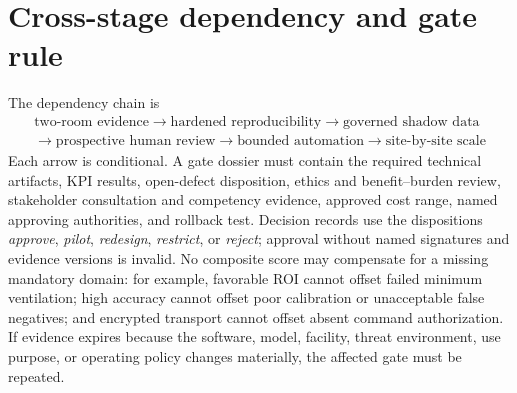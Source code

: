 \section{Cross-stage dependency and gate rule}
The dependency chain is
\begin{equation}
\begin{gathered}
\text{two-room evidence}\rightarrow\text{hardened reproducibility}\rightarrow\text{governed shadow data}\\
{}\rightarrow\text{prospective human review}\rightarrow\text{bounded automation}\rightarrow\text{site-by-site scale}
\end{gathered}
\end{equation}
Each arrow is conditional. A gate dossier must contain the required technical artifacts, KPI results, open-defect disposition, ethics and benefit--burden review, stakeholder consultation and competency evidence, approved cost range, named approving authorities, and rollback test. Decision records use the dispositions \emph{approve}, \emph{pilot}, \emph{redesign}, \emph{restrict}, or \emph{reject}; approval without named signatures and evidence versions is invalid. No composite score may compensate for a missing mandatory domain: for example, favorable ROI cannot offset failed minimum ventilation; high accuracy cannot offset poor calibration or unacceptable false negatives; and encrypted transport cannot offset absent command authorization. If evidence expires because the software, model, facility, threat environment, use purpose, or operating policy changes materially, the affected gate must be repeated.
